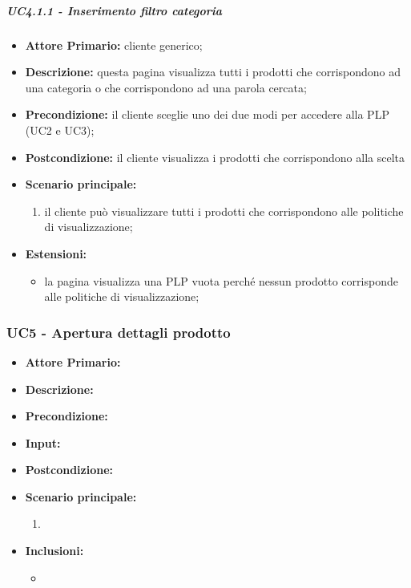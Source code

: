 \subparagraph{UC4.1.1 - Inserimento filtro categoria}
\begin{itemize}
    \item \textbf{Attore Primario:} cliente generico;
    \item \textbf{Descrizione:} questa pagina visualizza tutti i prodotti che corrispondono ad una categoria o che corrispondono ad una parola cercata;
    \item \textbf{Precondizione:} il cliente sceglie uno dei due modi per accedere alla PLP (UC2 e UC3);
    \item \textbf{Postcondizione:} il cliente visualizza i prodotti che corrispondono alla scelta
    \item \textbf{Scenario principale:}
    \begin{enumerate}
        \item il cliente può visualizzare tutti i prodotti che corrispondono alle politiche di visualizzazione;
    \end{enumerate}
    \item \textbf{Estensioni:}
    \begin{itemize}
        \item la pagina visualizza una PLP vuota perché nessun prodotto corrisponde alle politiche di visualizzazione;
    \end{itemize}
\end{itemize}

\subsubsection{UC5 - Apertura dettagli prodotto}
\begin{itemize}
    \item \textbf{Attore Primario:} 
    \item \textbf{Descrizione:}
    \item \textbf{Precondizione:}
    \item \textbf{Input:}
    \item \textbf{Postcondizione:}
    \item \textbf{Scenario principale:}
    \begin{enumerate}
        \item 
    \end{enumerate}
    \item \textbf{Inclusioni:}
    \begin{itemize}
        \item
    \end{itemize}
\end{itemize}
